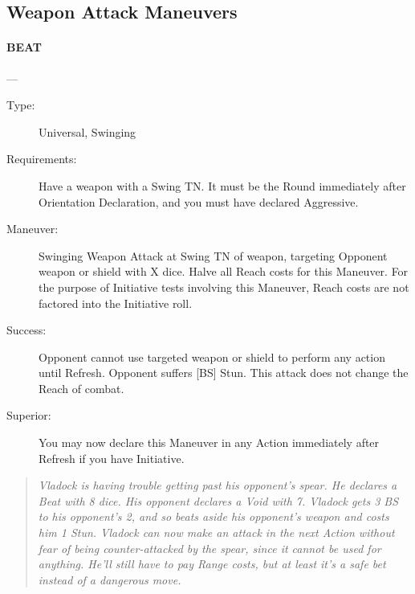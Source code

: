 \documentclass[oneside,11pt,english]{book}
\begin{document}
\subsection{Weapon Attack Maneuvers}
\paragraph{\large\label{man:BEAT} BEAT}---\quad{\large[X]}
\vspace{-10pt}\begin{description}
\item [Type:] Universal, Swinging
\item [Requirements:] Have a weapon with a Swing TN. It must be the Round immediately after Orientation Declaration, and you must have declared Aggressive.
\item [Maneuver:] Swinging Weapon Attack at Swing TN of weapon, targeting Opponent weapon or shield with X dice. Halve all Reach costs for this Maneuver. For the purpose of Initiative tests involving this Maneuver, Reach costs are not factored into the Initiative roll. 
\item [Success:] Opponent cannot use targeted weapon or shield to perform any action until Refresh. Opponent suffers [BS] Stun. This attack does not change the Reach of combat. 
\item [Superior:] You may now declare this Maneuver in any Action immediately after Refresh if you have Initiative. 
\end{description}
\begin{quotation}
\emph{Vladock is having trouble getting past his opponent’s spear. He declares a Beat with 8 dice. His opponent declares a Void with 7. Vladock gets 3 BS to his opponent’s 2, and so beats aside his opponent’s weapon and costs him 1 Stun. Vladock can now make an attack in the next Action without fear of being counter-attacked by the spear, since it cannot be used for anything. He’ll still have to pay Range costs, but at least it’s a safe bet instead of a dangerous move. }
\end{quotation}
\end{document}
